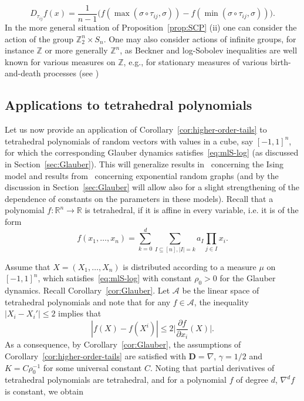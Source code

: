 \documentclass[a4paper]{amsart}
\theoremstyle{definition}
\theoremstyle{remark}
\numberwithin{equation}{section}
\newcommand*{\RR}{\mathbb{R}}
\begin{document}
\begin{displaymath}
  D_{\tau_{ij}} f(x) = \frac{1}{n-1}\Big(f(\max(\sigma\circ \tau_{ij},\sigma)) - f(\min(\sigma\circ \tau_{ij},\sigma))\Big).
\end{displaymath}
In the more general situation of Proposition~\ref{prop:SCP} (ii) one can consider the action of the group $\mathbb{Z}_2^n\times S_n$.
One may also consider actions of infinite groups, for instance $\mathbb{Z}$ or more generally $\mathbb{Z}^n$, as Beckner and log-Sobolev inequalities 
are well known for various measures on $\mathbb{Z}$, e.g., for stationary measures of various birth-and-death processes (see \cite{MR3129037,MR1944012,MR2548501,MR1710983,MR2052235})

\subsection{Applications to tetrahedral polynomials}

Let us now provide an application of Corollary~\ref{cor:higher-order-tails} to tetrahedral polynomials of random vectors with values in a cube, say $[-1,1]^n$, for which the corresponding Glauber dynamics satisfies~\eqref{eq:mlS-log} (as discussed in Section~\ref{sec:Glauber}). This will generalize results in~\cite{gtze2018higher,MR3949267} concerning the Ising model and results from~\cite{gtze2018concentration} concerning exponential random graphs (and by the discussion in Section~\ref{sec:Glauber} will allow also for a slight strengthening of the dependence of constants on the parameters in these models). Recall that a polynomial $f \colon \RR^n \to \RR$ is tetrahedral, if it is affine in every variable, i.e. it is of the form
\begin{displaymath}
  f(x_1,\ldots,x_n) = \sum_{k=0}^d \sum_{I \subseteq [n], |I| = k} a_I \prod_{j\in I} x_i.
\end{displaymath}

Assume that $X = (X_1,\ldots,X_n)$ is distributed according to a measure $\mu$ on $[-1,1]^n$, which satisfies~\eqref{eq:mlS-log} with constant $\rho_0 > 0$ for the Glauber dynamics. Recall Corollary~\ref{cor:Glauber}. Let $\mathcal{A}$ be the linear space of tetrahedral polynomials and note that for any $f \in \mathcal{A}$, the inequality $|X_i-X_i'|\le 2$ implies that
\begin{displaymath}
|f(X) - f(X^i)| \le 2 \Big|\frac{\partial f}{\partial x_i} (X)\Big|.
\end{displaymath}
As a consequence, by Corollary~\ref{cor:Glauber}, the assumptions of Corollary~\ref{cor:higher-order-tails} are satisfied with $\mathbf{D} = \nabla$, $\gamma= 1/2$ and $K = C\rho_0^{-1}$ for some universal constant $C$.
Noting that partial derivatives of tetrahedral polynomials are tetrahedral, and for a polynomial $f$ of degree $d$, $\nabla^d f$ is constant, we obtain
\end{document}
